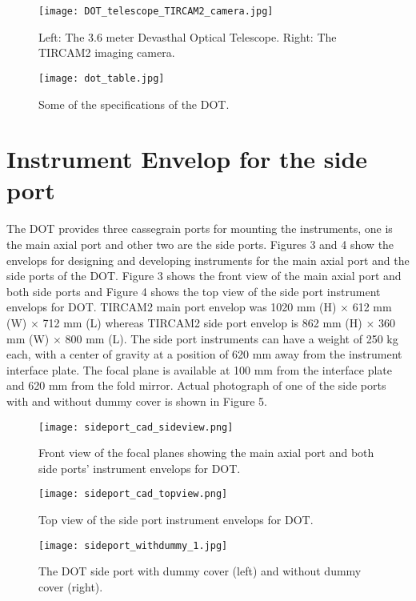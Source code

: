 \documentclass{jaa}
\begin{document}
\begin{figure}[!t]
\texttt{[image: DOT\_telescope\_TIRCAM2\_camera.jpg]}
\caption{Left: The 3.6 meter Devasthal Optical Telescope. Right: The TIRCAM2 imaging camera.}
\label{fig1}
\end{figure}


\begin{figure}[!t]
\texttt{[image: dot\_table.jpg]}
\caption{Some of the specifications of the DOT.}
\label{fig2}
\end{figure}

\section{Instrument Envelop for the side port}

The DOT provides three cassegrain ports for mounting the instruments, one is the main axial port and other two are the side ports. Figures 3 and 4 show the envelops for designing and developing instruments for the main axial port and the side ports of the DOT. 
Figure 3 shows the front view of the main axial port and both side ports and 
Figure 4 shows the top view of the side port instrument envelops for DOT.
TIRCAM2 main port envelop was 1020 mm (H) $\times$ 612 mm (W) $\times$ 712 mm (L) whereas TIRCAM2 side port envelop is 862 mm (H) $\times$ 360 mm (W) $\times$ 800 mm (L). The side port instruments can have a weight of 250 kg each, with a center of gravity at a position of 620 mm away from the instrument interface plate. The focal plane is available at 100 mm from the interface plate and 620 mm from the fold mirror. Actual photograph of one of the side ports with and without dummy cover is shown in Figure 5.


\begin{figure}[!h]
\texttt{[image: sideport\_cad\_sideview.png]}
\caption {Front view of the focal planes showing the main axial port and both side 
ports' instrument envelops for DOT.} 
\label{fig3}
\end{figure}

\begin{figure}[!h]
\texttt{[image: sideport\_cad\_topview.png]}
\caption {Top view of the side port instrument envelops for DOT.} 
\label{fig4}
\end{figure}


\begin{figure}[!h]
\texttt{[image: sideport\_withdummy\_1.jpg]}
\caption{The DOT side port with dummy cover (left) and without dummy cover (right).}\label{fig5}
\end{figure}
\end{document}
